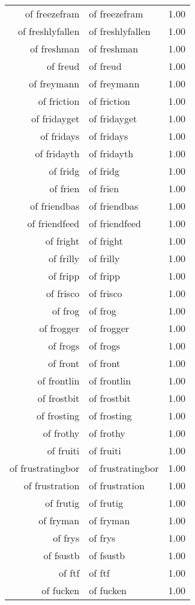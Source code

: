 \begin{table}[ht]
\begin{tabular}{rlr}
  of freezefram & of freezefram & 1.00 \\ 
  of freshlyfallen & of freshlyfallen & 1.00 \\ 
  of freshman & of freshman & 1.00 \\ 
  of freud & of freud & 1.00 \\ 
  of freymann & of freymann & 1.00 \\ 
  of friction & of friction & 1.00 \\ 
  of fridayget & of fridayget & 1.00 \\ 
  of fridays & of fridays & 1.00 \\ 
  of fridayth & of fridayth & 1.00 \\ 
  of fridg & of fridg & 1.00 \\ 
  of frien & of frien & 1.00 \\ 
  of friendbas & of friendbas & 1.00 \\ 
  of friendfeed & of friendfeed & 1.00 \\ 
  of fright & of fright & 1.00 \\ 
  of frilly & of frilly & 1.00 \\ 
  of fripp & of fripp & 1.00 \\ 
  of frisco & of frisco & 1.00 \\ 
  of frog & of frog & 1.00 \\ 
  of frogger & of frogger & 1.00 \\ 
  of frogs & of frogs & 1.00 \\ 
  of front & of front & 1.00 \\ 
  of frontlin & of frontlin & 1.00 \\ 
  of frostbit & of frostbit & 1.00 \\ 
  of frosting & of frosting & 1.00 \\ 
  of frothy & of frothy & 1.00 \\ 
  of fruiti & of fruiti & 1.00 \\ 
  of frustratingbor & of frustratingbor & 1.00 \\ 
  of frustration & of frustration & 1.00 \\ 
  of frutig & of frutig & 1.00 \\ 
  of fryman & of fryman & 1.00 \\ 
  of frys & of frys & 1.00 \\ 
  of fsustb & of fsustb & 1.00 \\ 
  of ftf & of ftf & 1.00 \\ 
  of fucken & of fucken & 1.00 \\ 

\end{tabular}
\end{table}
